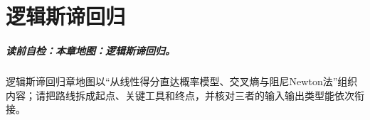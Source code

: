 
\chapter{逻辑斯谛回归}\label{chap:V2-C05}

\paragraph{读前自检：本章地图：逻辑斯谛回归。}逻辑斯谛回归章地图以“从线性得分直达概率模型、交叉熵与阻尼Newton法”组织内容；请把路线拆成起点、关键工具和终点，并核对三者的输入输出类型能依次衔接。\par

